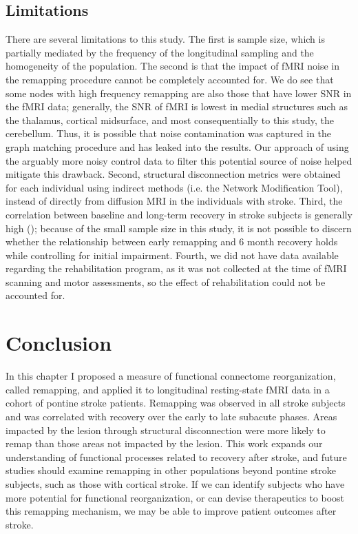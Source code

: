 \documentclass[phd,tocprelim]{cornell}
\begin{document}
	
	\subsection{Limitations}
	There are several limitations to this study. The first is sample size, which is partially mediated by the frequency of the longitudinal sampling and the homogeneity of the population. The second is that the impact of fMRI noise in the remapping procedure cannot be completely accounted for. We do see that some nodes with high frequency remapping are also those that have lower SNR in the fMRI data; generally, the SNR of fMRI is lowest in medial structures such as the thalamus, cortical midsurface, and most consequentially to this study, the cerebellum. Thus, it is possible that noise contamination was captured in the graph matching procedure and has leaked into the results. Our approach of using the arguably more noisy control data to filter this potential source of noise helped mitigate this drawback. Second, structural disconnection metrics were obtained for each individual using indirect methods (i.e. the Network Modification Tool), instead of directly from diffusion MRI in the individuals with stroke. Third, the correlation between baseline and long-term recovery in stroke subjects is generally high (\cite{Krakauer2015-sy}); because of the small sample size in this study, it is not possible to discern whether the relationship between early remapping and 6 month recovery holds while controlling for initial impairment. Fourth, we did not have data available regarding the rehabilitation program, as it was not collected at the time of fMRI scanning and motor assessments, so the effect of rehabilitation could not be accounted for. 

\section{Conclusion}
	In this chapter I proposed a measure of functional connectome reorganization, called remapping, and applied it to longitudinal resting-state fMRI data in a cohort of pontine stroke patients. Remapping was observed in all stroke subjects and was correlated with recovery over the early to late subacute phases. Areas impacted by the lesion through structural disconnection were more likely to remap than those areas not impacted by the lesion. This work expands our understanding of functional processes related to recovery after stroke, and future studies should examine remapping in other populations beyond pontine stroke subjects, such as those with cortical stroke. If we can identify subjects who have more potential for functional reorganization, or can devise therapeutics to boost this remapping mechanism, we may be able to improve patient outcomes after stroke.
	
\end{document}
